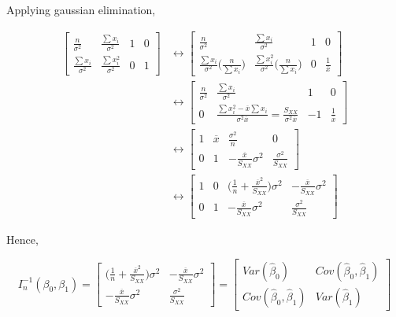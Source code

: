 \documentclass[]{book}
\theoremstyle{definition}
\theoremstyle{definition}
\theoremstyle{definition}
\theoremstyle{remark}
\begin{document}
Applying gaussian elimination,

\begin{equation*}
  \begin{split}
    \left[
    \begin{array}{cc|cc}
      \frac{n}{\sigma^2} & \frac{\sum x_i}{\sigma^2} & 1 & 0 \\
      \frac{\sum x_i}{\sigma^2} & \frac{\sum x_i^2}{\sigma^2} & 0 & 1
    \end{array}
    \right] & \leftrightarrow \left[
    \begin{array}{cc|cc}
      \frac{n}{\sigma^2} & \frac{\sum x_i}{\sigma^2} & 1 & 0 \\
      \frac{\sum x_i}{\sigma^2}\Big(\frac{n}{\sum x_i} \Big) & \frac{\sum x_i^2}{\sigma^2}\Big(\frac{n}{\sum x_i} \Big) & 0 & \frac{1}{\overline{x}}
    \end{array}
    \right] \\
    & \leftrightarrow \left[
    \begin{array}{cc|cc}
      \frac{n}{\sigma^2} & \frac{\sum x_i}{\sigma^2} & 1 & 0 \\
      0 & \frac{\sum x_i^2 - \overline{x}\sum x_i}{\sigma^2\overline{x}} = \frac{S_{XX}}{\sigma^2\overline{x}} & -1 & \frac{1}{\overline{x}}
    \end{array}
    \right] \\
    & \leftrightarrow \left[
    \begin{array}{cc|cc}
      1 & \overline{x} & \frac{\sigma^2}{n} & 0 \\
      0 & 1 & -\frac{\overline{x}}{S_{XX}}\sigma^2 & \frac{\sigma^2}{S_{XX}}
    \end{array}
    \right] \\
    & \leftrightarrow \left[
    \begin{array}{cc|cc}
      1 & 0 & \bigg(\frac{1}{n} + \frac{\overline{x}^2}{S_{XX}} \bigg)\sigma^2 & -\frac{\overline{x}}{S_{XX}}\sigma^2 \\
      0 & 1 & -\frac{\overline{x}}{S_{XX}}\sigma^2 & \frac{\sigma^2}{S_{XX}}
    \end{array}
    \right]
  \end{split}
\end{equation*}

Hence,

\[
I_n^{-1}(\beta_0, \beta_1) = \begin{bmatrix}
  \bigg(\frac{1}{n} + \frac{\overline{x}^2}{S_{XX}} \bigg)\sigma^2 & -\frac{\overline{x}}{S_{XX}}\sigma^2 \\
  -\frac{\overline{x}}{S_{XX}}\sigma^2 & \frac{\sigma^2}{S_{XX}}
\end{bmatrix} = \begin{bmatrix}
  Var(\hat\beta_0) & Cov(\hat\beta_0, \hat\beta_1) \\
  Cov(\hat\beta_0, \hat\beta_1) & Var(\hat\beta_1)
\end{bmatrix}
\]
\end{document}
